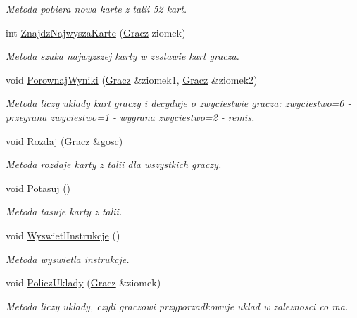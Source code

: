 \begin{DoxyCompactItemize}
\begin{DoxyCompactList}\small\item\em Metoda pobiera nowa karte z talii 52 kart. \end{DoxyCompactList}\item 
int \hyperlink{class_g_r_a_aba14465002d4fa6440beca25bf3de2bc}{Znajdz\-Najwysza\-Karte} (\hyperlink{class_gracz}{Gracz} ziomek)
\begin{DoxyCompactList}\small\item\em Metoda szuka najwyzszej karty w zestawie kart gracza. \end{DoxyCompactList}\item 
void \hyperlink{class_g_r_a_a0c6db7542b551b1c514f70b3ea9a358c}{Porownaj\-Wyniki} (\hyperlink{class_gracz}{Gracz} \&ziomek1, \hyperlink{class_gracz}{Gracz} \&ziomek2)
\begin{DoxyCompactList}\small\item\em Metoda liczy uklady kart graczy i decyduje o zwyciestwie gracza\-: zwyciestwo=0 -\/ przegrana zwyciestwo=1 -\/ wygrana zwyciestwo=2 -\/ remis. \end{DoxyCompactList}\item 
void \hyperlink{class_g_r_a_a3d86b57e35ee8ff610a056c92dfa325b}{Rozdaj} (\hyperlink{class_gracz}{Gracz} \&gosc)
\begin{DoxyCompactList}\small\item\em Metoda rozdaje karty z talii dla wszystkich graczy. \end{DoxyCompactList}\item 
void \hyperlink{class_g_r_a_ab18509b806b22568ba97a8ab4f121ae2}{Potasuj} ()
\begin{DoxyCompactList}\small\item\em Metoda tasuje karty z talii. \end{DoxyCompactList}\item 
void \hyperlink{class_g_r_a_a532269809ccd27cde2c8a7822bfc1a43}{Wyswietl\-Instrukcje} ()
\begin{DoxyCompactList}\small\item\em Metoda wyswietla instrukcje. \end{DoxyCompactList}\item 
void \hyperlink{class_g_r_a_abfc9b5fdad9fef80496cb5b6ece66ed9}{Policz\-Uklady} (\hyperlink{class_gracz}{Gracz} \&ziomek)
\begin{DoxyCompactList}\small\item\em Metoda liczy uklady, czyli graczowi przyporzadkowuje uklad w zaleznosci co ma. \end{DoxyCompactList}\item 

\end{DoxyCompactItemize}
